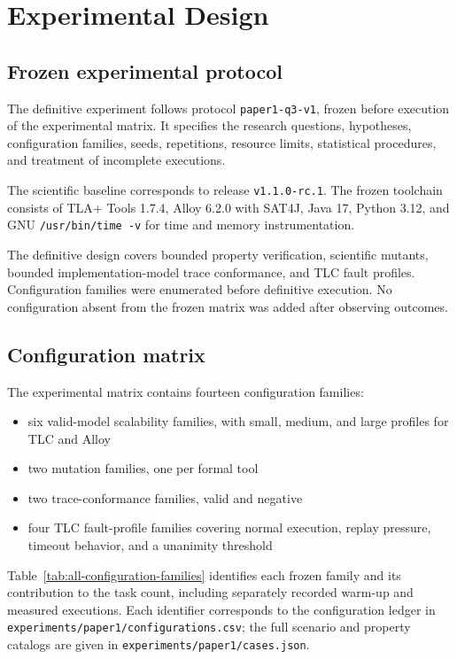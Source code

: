 \section{Experimental Design}
\label{sec:experimental-design}

\subsection{Frozen experimental protocol}
\label{subsec:frozen-protocol}

The definitive experiment follows protocol \texttt{paper1-q3-v1}, frozen before
execution of the experimental matrix. It specifies the research questions,
hypotheses, configuration families, seeds, repetitions, resource limits,
statistical procedures, and treatment of incomplete executions.

The scientific baseline corresponds to release \texttt{v1.1.0-rc.1}. The frozen
toolchain consists of TLA+ Tools 1.7.4, Alloy 6.2.0 with SAT4J, Java 17,
Python 3.12, and GNU \texttt{/usr/bin/time -v} for time and memory
instrumentation.

The definitive design covers bounded property verification, scientific mutants,
bounded implementation-model trace conformance, and TLC fault profiles.
Configuration families were enumerated before definitive execution. No
configuration absent from the frozen matrix was added after observing outcomes.

\subsection{Configuration matrix}
\label{subsec:configuration-matrix}

The experimental matrix contains fourteen configuration families:

\begin{itemize}
\item six valid-model scalability families, with small, medium, and large
profiles for TLC and Alloy
\item two mutation families, one per formal tool
\item two trace-conformance families, valid and negative
\item four TLC fault-profile families covering normal execution, replay
pressure, timeout behavior, and a unanimity threshold
\end{itemize}

Table~\ref{tab:all-configuration-families} identifies each frozen family and its
contribution to the task count, including separately recorded warm-up and
measured executions. Each identifier corresponds to the configuration ledger
in \texttt{experiments/paper1/configurations.csv}; the full scenario and
property catalogs are given in \texttt{experiments/paper1/cases.json}.


